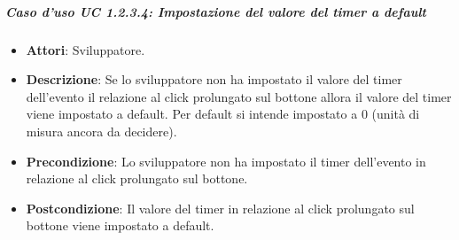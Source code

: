 \subparagraph{Caso d'uso UC 1.2.3.4: Impostazione del valore del timer a default}

\FloatBarrier
\begin{itemize}
\item\textbf{Attori}: Sviluppatore.
\item\textbf{Descrizione}: Se lo sviluppatore non ha impostato il valore del timer dell'evento il relazione al click prolungato sul bottone allora il valore del timer viene impostato a default. Per default si intende impostato a 0 (unità di misura ancora da decidere). 
\item\textbf{Precondizione}: Lo sviluppatore non ha impostato il timer dell'evento in relazione al click prolungato sul bottone.
\item\textbf{Postcondizione}: Il valore del timer in relazione al click prolungato sul bottone viene impostato a default.
\end{itemize}
